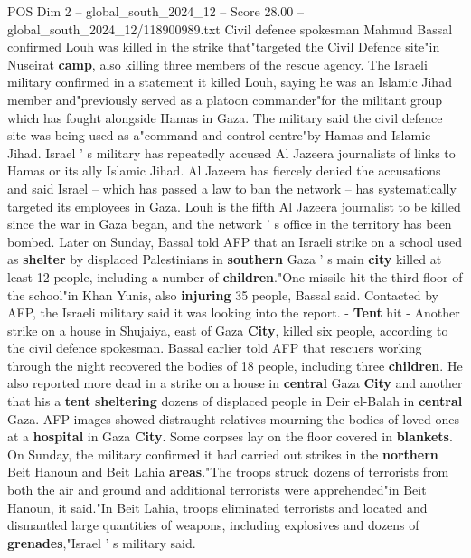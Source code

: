\begin{textsample}{POS Dim 2 – global\_south\_2024\_12 – Score 28.00 – global\_south\_2024\_12/118900989.txt}  \label{ex:f2_pos_065}
Civil defence spokesman Mahmud Bassal confirmed Louh was killed in the strike that"targeted the Civil Defence site"in Nuseirat \textbf{camp}, also killing three members of the rescue agency.
The Israeli military confirmed in a statement it killed Louh, saying he was an Islamic Jihad member and"previously served as a platoon commander"for the militant group which has fought alongside Hamas in Gaza.
The military said the civil defence site was being used as a"command and control centre"by Hamas and Islamic Jihad.
Israel ' s military has repeatedly accused Al Jazeera journalists of links to Hamas or its ally Islamic Jihad.
Al Jazeera has fiercely denied the accusations and said Israel -- which has passed a law to ban the network -- has systematically targeted its employees in Gaza.
Louh is the fifth Al Jazeera journalist to be killed since the war in Gaza began, and the network ' s office in the territory has been bombed.
Later on Sunday, Bassal told AFP that an Israeli strike on a school used as \textbf{shelter} by displaced Palestinians in \textbf{southern} Gaza ' s main \textbf{city} killed at least 12 people, including a number of \textbf{children}."One missile hit the third floor of the school"in Khan Yunis, also \textbf{injuring} 35 people, Bassal said.
Contacted by AFP, the Israeli military said it was looking into the report. - \textbf{Tent} hit - Another strike on a house in Shujaiya, east of Gaza \textbf{City}, killed six people, according to the civil defence spokesman.
Bassal earlier told AFP that rescuers working through the night recovered the bodies of 18 people, including three \textbf{children}.
He also reported more dead in a strike on a house in \textbf{central} Gaza \textbf{City} and another that his a \textbf{tent} \textbf{sheltering} dozens of displaced people in Deir el-Balah in \textbf{central} Gaza.
AFP images showed distraught relatives mourning the bodies of loved ones at a \textbf{hospital} in Gaza \textbf{City}.
Some corpses lay on the floor covered in \textbf{blankets}.
On Sunday, the military confirmed it had carried out strikes in the \textbf{northern} Beit Hanoun and Beit Lahia \textbf{areas}."The troops struck dozens of terrorists from both the air and ground and additional terrorists were apprehended"in Beit Hanoun, it said."In Beit Lahia, troops eliminated terrorists and located and dismantled large quantities of weapons, including explosives and dozens of \textbf{grenades},"Israel ' s military said.

\end{textsample}
